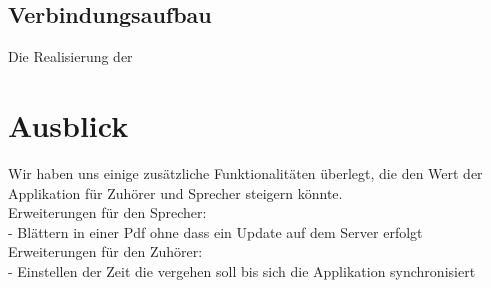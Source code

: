 \subsection{Verbindungsaufbau}
Die Realisierung der 
\section{Ausblick}
Wir haben uns einige zusätzliche Funktionalitäten überlegt, die den Wert der Applikation für Zuhörer und Sprecher steigern könnte.\\
Erweiterungen für den Sprecher:\\
- Blättern in einer Pdf ohne dass ein Update auf dem Server erfolgt\\
Erweiterungen für den Zuhörer:\\
- Einstellen der Zeit die vergehen soll bis sich die Applikation synchronisiert\\